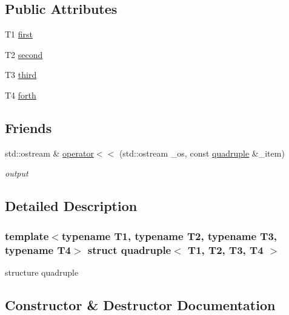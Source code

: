 \subsection*{Public Attributes}
\begin{DoxyCompactItemize}
\item 
T1 \hyperlink{structquadruple_a45642eeda831800cd5c540037822ac65}{first}
\item 
T2 \hyperlink{structquadruple_aa93ca1ef60012d07903333d7b16bb32b}{second}
\item 
T3 \hyperlink{structquadruple_af1ada0ce5f85bbc7df2c5bfb113b442d}{third}
\item 
T4 \hyperlink{structquadruple_abab1a25fd1ed39d2605eaa9371de04ca}{forth}
\end{DoxyCompactItemize}
\subsection*{Friends}
\begin{DoxyCompactItemize}
\item 
std\+::ostream \& \hyperlink{structquadruple_af619be80f82068b7b05a8d943196f024}{operator$<$$<$} (std\+::ostream \+\_\+os, const \hyperlink{structquadruple}{quadruple} \&\+\_\+item)
\begin{DoxyCompactList}\small\item\em output \end{DoxyCompactList}\end{DoxyCompactItemize}


\subsection{Detailed Description}
\subsubsection*{template$<$typename T1, typename T2, typename T3, typename T4$>$\newline
struct quadruple$<$ T1, T2, T3, T4 $>$}

structure quadruple 

\subsection{Constructor \& Destructor Documentation}
\mbox{\label{structquadruple_ab4b318f9f20c5f861c0b7445bf806da8}} 
